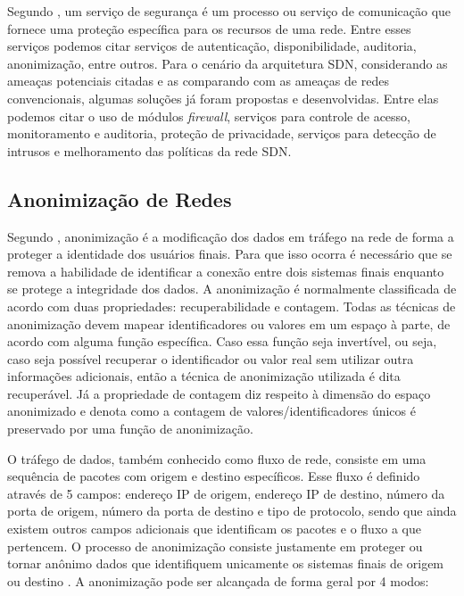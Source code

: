   Segundo , um serviço de segurança é um processo ou serviço de comunicação que fornece uma proteção específica para os recursos de uma rede. Entre esses serviços podemos citar serviços de autenticação, disponibilidade, auditoria, anonimização, entre outros. Para o cenário da arquitetura SDN, considerando as ameaças potenciais citadas e as comparando com as ameaças de redes convencionais, algumas soluções já foram propostas e desenvolvidas. Entre elas podemos citar o uso de módulos \emph{firewall}, serviços para controle de acesso, monitoramento e auditoria, proteção de privacidade, serviços para detecção de intrusos e melhoramento das políticas da rede SDN.\cite{ALSMADI}


\subsection{Anonimização de Redes}

Segundo , anonimização é a modificação dos dados em tráfego na rede de forma a proteger a identidade dos usuários finais. Para que isso ocorra é necessário que se remova a habilidade de identificar a conexão entre dois sistemas finais enquanto se protege a integridade dos dados. A anonimização é normalmente classificada de acordo com duas propriedades: recuperabilidade e contagem. Todas as técnicas de anonimização devem mapear identificadores ou valores em um espaço à parte, de acordo com alguma função específica. Caso essa função seja invertível, ou seja, caso seja possível recuperar o identificador ou valor real sem utilizar outra informações adicionais, então a técnica de anonimização utilizada é dita recuperável. Já a propriedade de contagem diz respeito à dimensão do espaço anonimizado e denota como a contagem de valores/identificadores únicos é preservado por uma função de anonimização.
\par O tráfego de dados, também conhecido como fluxo de rede, consiste em uma sequência de pacotes com origem e destino específicos. Esse fluxo é definido através de 5 campos: endereço IP de origem, endereço IP de destino, número da porta de origem, número da porta de destino e tipo de protocolo, sendo que ainda existem outros campos adicionais que identificam os pacotes e o fluxo a que pertencem. O processo de anonimização consiste justamente em proteger ou tornar anônimo dados que identifiquem unicamente os sistemas finais de origem ou destino \cite{farah}. A anonimização pode ser alcançada de forma geral por 4 modos: \cite{brekne}

